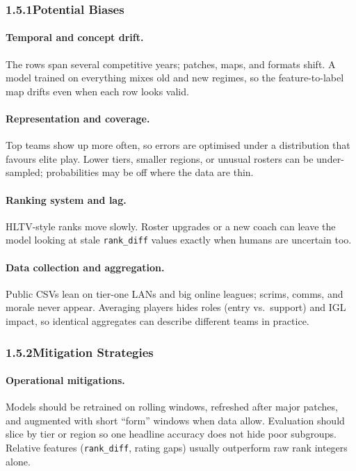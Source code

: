 \documentclass[12pt,a4paper]{article}
\begin{document}
\subsubsection{1.5.1\quad Potential Biases}

\paragraph{Temporal and concept drift.}
The rows span several competitive years; patches, maps, and formats shift. A model trained on everything mixes old and new regimes, so the feature-to-label map drifts even when each row looks valid.

\paragraph{Representation and coverage.}
Top teams show up more often, so errors are optimised under a distribution that favours elite play. Lower tiers, smaller regions, or unusual rosters can be under-sampled; probabilities may be off where the data are thin.

\paragraph{Ranking system and lag.}
HLTV-style ranks move slowly. Roster upgrades or a new coach can leave the model looking at stale \texttt{rank\_diff} values exactly when humans are uncertain too.

\paragraph{Data collection and aggregation.}
Public CSVs lean on tier-one LANs and big online leagues; scrims, comms, and morale never appear. Averaging players hides roles (entry vs.\ support) and IGL impact, so identical aggregates can describe different teams in practice.

\subsubsection{1.5.2\quad Mitigation Strategies}

\paragraph{Operational mitigations.}
Models should be retrained on rolling windows, refreshed after major patches, and augmented with short ``form'' windows when data allow. Evaluation should slice by tier or region so one headline accuracy does not hide poor subgroups. Relative features (\texttt{rank\_diff}, rating gaps) usually outperform raw rank integers alone.
\end{document}
